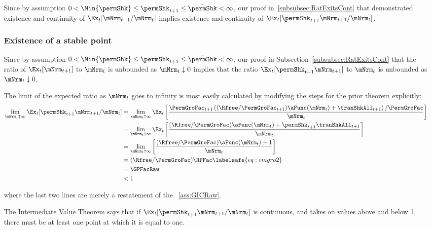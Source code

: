 \documentclass[\econtexRoot/BufferStockTheory]{subfiles}
\begin{document}
Since by assumption $ 0 < \Min{\permShk} \leq \permShk_{t+1} \leq \bar{\permShk} < \infty$, our proof in~\ref{subsubsec:RatExitsCont} that demonstrated existence and continuity of $\Ex_{t}[\mNrm_{t+1}/\mNrm_{t}]$ implies existence and continuity of $\Ex_{t}[\permShk_{t+1}\mNrm_{t+1}/\mNrm_{t}]$.

\subsubsection{Existence of a stable point}

Since by assumption $ 0 < \Min{\permShk} \leq \permShk_{t+1} \leq \bar{\permShk} < \infty$, our proof in Subsection~\ref{subsubsec:RatExitsCont} that the ratio of $\Ex_{t}[\mNrm_{t+1}]$ to $\mNrm_{t}$ is unbounded as $\mNrm_{t} \downarrow 0$ implies that the ratio $\Ex_{t}[\permShk_{t+1}\mNrm_{t+1}]$ to $\mNrm_{t}$ is unbounded as $\mNrm_{t} \downarrow 0$.

  
The limit of the expected ratio as $\mNrm_{t}$ goes to infinity is most easily calculated by modifying the steps for the prior theorem explicitly:
\begin{align}
  \lim_{\mNrm_{t} \uparrow \infty} \Ex_{t}[\permShk_{t+1}\mNrm_{t+1}/\mNrm_{t}]  & =   
                                                                  \lim_{\mNrm_{t} \uparrow \infty} 
                                                                  \Ex_{t}\left[\frac{\PermGroFac_{t+1}\left((\Rfree/\PermGroFac_{t+1})\aFunc(\mNrm_{t})+{\tranShkAll}_{t+1}\right)/\PermGroFac}{\mNrm_{t}}\right] \notag 
  \\   & =   \lim_{\mNrm_{t} \uparrow \infty} \Ex_{t}\left[
         \frac{(\Rfree/\PermGroFac)\aFunc(\mNrm_{t})+\permShk_{t+1}{\tranShkAll}_{t+1}}{\mNrm_{t}}
         \right] \notag 
  \\   & =   \lim_{\mNrm_{t} \uparrow \infty} \left[
         \frac{(\Rfree/\PermGroFac)\aFunc(\mNrm_{t})+1}{\mNrm_{t}}
         \right] \notag 
  \\  & = (\Rfree/\PermGroFac)\RPFac \labelsafe{eq:emgro2}
  \\  & = \GPFacRaw \notag
  \\  & < 1 \notag
\end{align}

where the last two lines are merely a restatement of the \GICRaw~\eqref{ass:GICRaw}.

The Intermediate Value Theorem says that if $\Ex_{t}[\permShk_{t+1}\mNrm_{t+1}/\mNrm_t]$ is continuous, and takes on values above and below 1, there must be at least one point at which it is equal to one.
\end{document}
